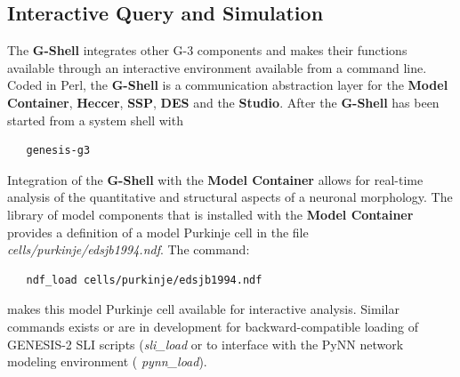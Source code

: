 \documentclass[12pt]{article}
\begin{document}
\subsection{Interactive Query and Simulation}

The {\bf G-Shell} integrates other G-3 components and makes their
functions available through an interactive environment available from
a command line.  Coded in Perl, the {\bf G-Shell} is a communication
abstraction layer for the {\bf Model Container}, {\bf Heccer}, {\bf
  SSP}, {\bf DES} and the {\bf Studio}.  After the {\bf G-Shell} has
been started from a system shell with
\begin{verbatim}
   genesis-g3
\end{verbatim}




Integration of the {\bf G-Shell} with the {\bf Model Container} allows
for real-time analysis of the quantitative and structural aspects of a
neuronal morphology.  The library of model components that is
installed with the {\bf Model Container} provides a definition of a
model Purkinje cell in the file {\it cells/purkinje/edsjb1994.ndf}.
The command:
\begin{verbatim}
   ndf_load cells/purkinje/edsjb1994.ndf
\end{verbatim}
makes this model Purkinje cell available for interactive analysis.
Similar commands exists or are in development for backward-compatible
loading of GENESIS-2 SLI scripts ({\it sli\_load} or to interface with
the PyNN network modeling environment ({\it
  pynn\_load})\cite{davison08:_pynn}.

\end{document}
